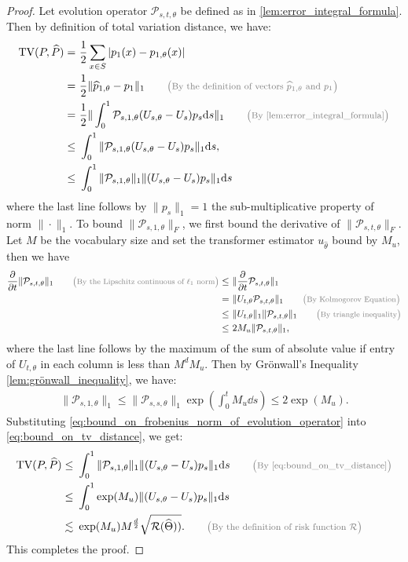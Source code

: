 \documentclass[12pt]{article}
\numberwithin{equation}{section}
\let\hat\widehat
\newcommand{\wh}{\widehat}
\renewcommand{\hat}{\wh}
\theoremstyle{theoremstyle}
\numberwithin{equation}{section}
\numberwithin{theorem}{section}
\numberwithin{proposition}{section}
\numberwithin{definition}{section}
\numberwithin{lemma}{section}
\numberwithin{assumption}{section}
\numberwithin{remark}{section}
\newcommand*{\annot}[1]{\tag*{\footnotesize{\textcolor{black!50}{\big(#1\big)}}}}
\begin{document}
\begin{proof}
Let evolution operator $\mathcal{P}_{s,t,\theta}$ be defined as in \cref{lem:error_integral_formula}.
Then by definition of total variation distance, we have:
\begin{align}
    \text{TV}(P,\hat{P})
    = & ~ \frac{1}{2} \sum_{x \in S} |p_1(x)-p_{1,\theta}(x)| \notag \\
    = & ~ \frac{1}{2} \|\hat{p}_{1,\theta}-p_1\|_1  \annot{By the definition of vectors $\hat{p}_{1,\theta}$ and $p_1$} \notag \\
    = & ~
    \frac{1}{2} \| \int_0^1 \mathcal{P}_{s,1,\theta}(U_{s,\theta}-U_s)p_s \dd s\|_1
    \annot{By \cref{lem:error_integral_formula}} \\
    \leq & ~
    \int_0^1 \| \mathcal{P}_{s,1,\theta}(U_{s,\theta}-U_s)p_s\|_1 \dd s, \notag \\
    \leq & ~
    \int_0^1 \|\mathcal{P}_{s,1,\theta}\|_1 
    \|(U_{s,\theta}-U_s)p_s\|_1 \dd s
    \label{eq:bound_on_tv_distance}
\end{align}
where the last line follows by $\|p_s\|_1 = 1$ the sub-multiplicative property of norm $\|\cdot\|_1$.
To bound $\|\mathcal{P}_{s,1,\theta}\|_F$,
we first bound the derivative of $\|\mathcal{P}_{s,t,\theta}\|_F$. 
Let $M$ be the vocabulary size and set the transformer estimator $u_{\hat{\theta}}$ bound by $M_u$, then we have
\begin{align}
\label{eq:bound_on_evolution_operator_partial_norm}
    \frac{\partial}{\partial t}\|\mathcal{P}_{s,t,\theta}\|_1 \annot{By the Lipschitz continuous of $\ell_1$ norm} 
    \leq & ~
    \|\frac{\partial}{\partial t}\mathcal{P}_{s,t,\theta}\|_1 \notag\\
    = & ~ 
    \|U_{t,\theta}\mathcal{P}_{s,t,\theta}\|_1 \annot{By Kolmogorov Equation} \\
    \leq & ~ \|U_{t,\theta}\|_1 \|\mathcal{P}_{s,t,\theta}\|_1 \annot{By triangle inequality} \\
    \leq & ~ 2M_u \|\mathcal{P}_{s,t,\theta}\|_1, 
\end{align}
where the last line follows by the maximum of the sum of absolute value if entry of $U_{t,\theta}$ in each column is less than $M^d M_u$.
Then by Grönwall’s Inequality \cref{lem:grönwall_inequality}, we have:
\begin{align}\label{eq:bound_on_frobenius_norm_of_evolution_operator}
    \|\mathcal{P}_{s,1,\theta}\|_1 
    \leq \|\mathcal{P}_{s,s,\theta}\|_1 \exp(\int_0^t  M_u \dd s)
    \leq 2\exp(M_u).
\end{align}
Substituting \eqref{eq:bound_on_frobenius_norm_of_evolution_operator} into 
\eqref{eq:bound_on_tv_distance}, we get:
\begin{align*}
    \text{TV}(P,\hat{P})
    \leq & ~ 
    \int_0^1 \|\mathcal{P}_{s,1,\theta}\|_1 
    \|(U_{s,\theta}-U_s)p_s\|_1 \dd s \annot{By \eqref{eq:bound_on_tv_distance}} \\
    \leq & ~
    \int_0^1 \exp(M_u) 
    \|(U_{s,\theta}-U_s)p_s\|_1 \dd s \\
    \lesssim & ~
    \exp(M_u) M^{\frac{d}{2}}
    \sqrt{\mathcal{R}(\hat{\Theta}))}. 
    \annot{By the definition of risk function $\cal{R}$}
\end{align*}
This completes the proof.
\end{proof}
\end{document}
